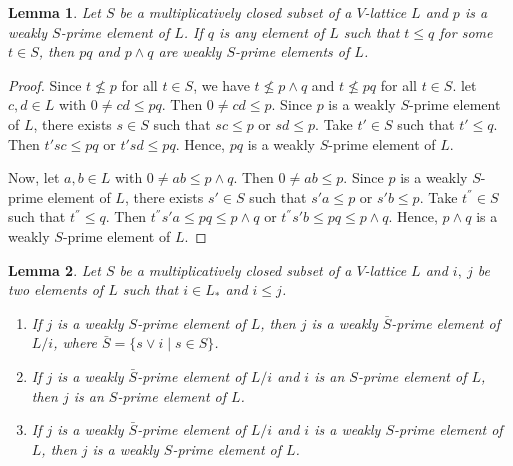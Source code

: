 \documentclass[10pt,twoside,a4paper]{amsart}
\numberwithin{equation}{section}
\theoremstyle{plain}
\newtheorem{lem}{Lemma}[section]
\theoremstyle{definition}
\begin{document}
\begin{lem}%
	Let $S$ be a multiplicatively closed subset of a $V$-lattice $L$ and $p$ is a  weakly $S$-prime element of $L$. If $q$ is any element of $L$ such that   $t\leq q$ for some $t\in S$, then $pq$ and  $p\wedge q$ are  weakly $S$-prime elements of $L$.
\end{lem}
\begin{proof} 
	Since $t \nleq p$ for all $t \in S$, we have  $t\nleq p\wedge q$  and $t \nleq pq$ for all $t\in S$. let $c,d\in L$ with $0 \neq cd\leq p q$. Then $ 0 \neq cd\leq p$. Since $p$ is a  weakly $S$-prime element of $L$, there exists $s\in S$ such that $sc\leq p$ or $sd\leq p$. Take $t'\in S$ such that $t'\leq q$. Then $t'sc\leq pq $ or $t'sd\leq pq $. Hence, $p q$ is a weakly $S$-prime element of $L$.
	
	Now, let $a,b\in L$ with $0 \neq ab\leq p\wedge q$. Then $ 0 \neq ab\leq p$. Since $p$ is a  weakly $S$-prime element of $L$, there exists $s'\in S$ such that $s'a\leq p$ or $s'b\leq p$. Take $t^{''}\in S$ such that $t^{''}\leq q$. Then $t^{''}s'a\leq pq \leq  p\wedge q$ or $t^{''}s'b\leq pq \leq  p\wedge q$. Hence, $p\wedge q$ is a weakly $S$-prime element of $L$. 
\end{proof}



\begin{lem}%
	Let $S$ be a multiplicatively closed subset of a $V$-lattice $L$ and $i,~j$ be two elements of $L$ such that $i \in L_*$ and $i \leq j$.
	
	\begin{enumerate}
		\item If $j$ is a weakly $S$-prime element of $L$, then $j$ is a weakly $\bar{S}$-prime element of $L/i$,  where $\bar{S} = \{s \vee i \;|\; s\in S\}$.
		
		\item If $j$ is a weakly $\bar{S}$-prime element of $L/i$ and $i$ is an $S$-prime element of $L$, then $j$ is an $S$-prime element of $L$.
		
		\item If $j$ is a weakly $\bar{S}$-prime element of $L/i$ and $i$ is a weakly  $S$-prime element of $L$, then $j$ is a weakly   $S$-prime element of $L$.
	\end{enumerate}
\end{lem}
\end{document}
